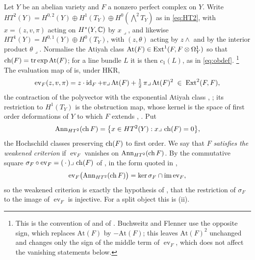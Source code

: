 \begin{setupenv}\label{setup:criterion}
Let $Y$ be an abelian variety and $F$ a nonzero perfect complex on $Y$. Write
$HT^{2}(Y)=H^{0,2}(Y)\oplus H^{1}(T_{Y})\oplus H^{0}(\bigwedge^{2}T_{Y})$ as
in \eqref{eq:HT2}, with $x=(z,v,\pi)$ acting on $H^{*}(Y,\mathbb{C})$ by
$x\lrcorner$, and likewise $HT^{1}(Y)=H^{0,1}(Y)\oplus H^{0}(T_{Y})$, with
$(z,\theta)$ acting by $z\wedge$ and by the interior product $\theta\lrcorner$.
Normalise the Atiyah class $\mathrm{At}(F)\in\operatorname{Ext}^{1}(F,F\otimes\Omega^{1}_{Y})$
so that $\operatorname{ch}(F)=\operatorname{tr}\exp\mathrm{At}(F)$; for a line bundle $L$
it is then $c_{1}(L)$, as in \eqref{eq:obdef}.%
\footnote{This is the convention of \cite{Tod09} and of
\cite[footnote 14]{Mar25a}. Buchweitz and Flenner use the opposite sign,
which replaces $\mathrm{At}(F)$ by $-\mathrm{At}(F)$; this leaves
$\mathrm{At}(F)^{2}$ unchanged and changes only the sign of the middle term
of $\operatorname{ev}_{F}$, which does not affect the vanishing statements
below.}
The evaluation map of  is, under HKR,
\begin{equation}\label{eq:evgeneral}
  \operatorname{ev}_{F}(z,v,\pi)=z\cdot\operatorname{id}_{F}+v\lrcorner\,\mathrm{At}(F)
  +\tfrac12\,\pi\lrcorner\,\mathrm{At}(F)^{2}\;\in\;\operatorname{Ext}^{2}(F,F),
\end{equation}
the contraction of the polyvector with the exponential Atiyah class
\cite[Theorem A]{Hua21}, \cite{BF08}; its restriction to $H^{1}(T_{Y})$ is the
obstruction map, whose kernel is the space of first order deformations of $Y$
to which $F$ extends \cite{Tod09}, \cite[Section 8.3]{Mar25a}. Put
\[
  \operatorname{Ann}_{HT^{2}}(\operatorname{ch} F)=\bigl\{x\in HT^{2}(Y):x\lrcorner\,\operatorname{ch}(F)=0\bigr\},
\]
the Hochschild classes preserving $\operatorname{ch}(F)$ to first order. We say that $F$
\emph{satisfies the weakened criterion} if $\operatorname{ev}_{F}$ vanishes on
$\operatorname{Ann}_{HT^{2}}(\operatorname{ch} F)$. By the commutative square
$\sigma_{F}\circ\operatorname{ev}_{F}=(\,\cdot\,)\lrcorner\,\operatorname{ch}(F)$ of
\cite[Proposition 6.2.1 and Corollary 6.3.2]{BF08}, in the form quoted in
\cite[Lemma 11.3]{Mar25b},
\[
  \operatorname{ev}_{F}\bigl(\operatorname{Ann}_{HT^{2}}(\operatorname{ch} F)\bigr)
  =\ker\sigma_{F}\cap\operatorname{im}\operatorname{ev}_{F},
\]
so the weakened criterion is exactly the hypothesis of
\cite[Question 11.4]{Mar25b}, that the restriction of $\sigma_{F}$ to the
image of $\operatorname{ev}_{F}$ is injective. For a split object this is
(ii).
\end{setupenv}

